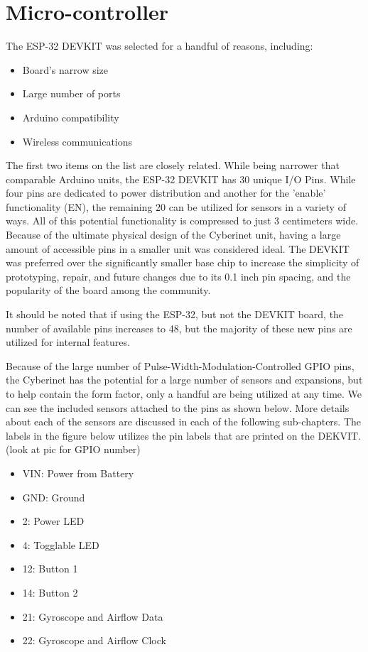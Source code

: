 \section{Micro-controller}
The ESP-32 DEVKIT was selected for a handful of reasons, including:

\begin{itemize}
    \item Board's narrow size
    \item Large number of ports
    \item Arduino compatibility
    \item Wireless communications
\end{itemize}

The first two items on the list are closely related. While being narrower that comparable Arduino units, the ESP-32 DEVKIT has 30 unique I/O Pins. While four pins are dedicated to power distribution and another for the 'enable' functionality (EN), the remaining 20 can be utilized for sensors in a variety of ways. All of this potential functionality is compressed to just 3 centimeters wide. Because of the ultimate physical design of the Cyberinet unit, having a large amount of accessible pins in a smaller unit was considered ideal. The DEVKIT was preferred over the significantly smaller base chip to increase the simplicity of prototyping, repair, and future changes due to its 0.1 inch pin spacing, and the popularity of the board among the community.

It should be noted that if using the ESP-32, but not the DEVKIT board, the number of available pins increases to 48, but the majority of these new pins are utilized for internal features. 

Because of the large number of Pulse-Width-Modulation-Controlled GPIO pins, the Cyberinet has the potential for a large number of sensors and expansions, but to help contain the form factor, only a handful are being utilized at any time. We can see the included sensors attached to the pins as shown below. More details about each of the sensors are discussed in each of the following sub-chapters. The labels in the figure below utilizes the pin labels that are printed on the DEKVIT. (look at pic for GPIO number)

\begin{itemize}
    \item VIN: Power from Battery
    \item GND: Ground
    \item 2: Power LED
    \item 4: Togglable LED
    \item 12: Button 1
    \item 14: Button 2
    \item 21: Gyroscope and Airflow Data
    \item 22: Gyroscope and Airflow Clock
\end{itemize}

